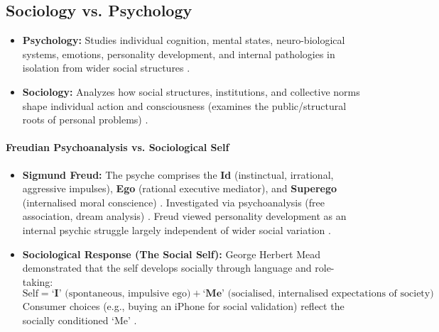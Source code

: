 \subsection{Sociology vs. Psychology}

\begin{ComparisonBox}
\begin{itemize}
    \item \textbf{Psychology:} Studies individual cognition, mental states, neuro-biological systems, emotions, personality development, and internal pathologies in isolation from wider social structures .
    \item \textbf{Sociology:} Analyzes how social structures, institutions, and collective norms shape individual action and consciousness (examines the public/structural roots of personal problems) .
\end{itemize}
\end{ComparisonBox}

\paragraph{Freudian Psychoanalysis vs. Sociological Self}
\begin{KeyConcept}
\begin{itemize}
    \item \textbf{Sigmund Freud:} The psyche comprises the \textbf{Id} (instinctual, irrational, aggressive impulses), \textbf{Ego} (rational executive mediator), and \textbf{Superego} (internalised moral conscience) . Investigated via psychoanalysis (free association, dream analysis) . Freud viewed personality development as an internal psychic struggle largely independent of wider social variation .
    \item \textbf{Sociological Response (The Social Self):} George Herbert Mead demonstrated that the self develops socially through language and role-taking:
    $$\text{Self} = \textbf{`I'} \text{ (spontaneous, impulsive ego)} + \textbf{`Me'} \text{ (socialised, internalised expectations of society)}$$
    Consumer choices (e.g., buying an iPhone for social validation) reflect the socially conditioned `Me' .
\end{itemize}
\end{KeyConcept}

